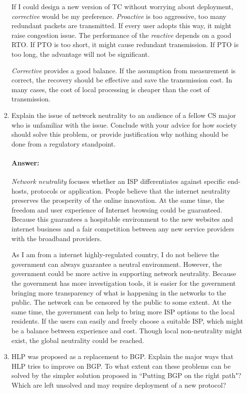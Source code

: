 \documentclass[a4paper,11pt]{article}
\theoremstyle{mytheor}
\begin{document}
\begin{enumerate}
If I could design a new version of TC without worrying about deployment, 
\emph{corrective} would be my preference.
\emph{Proactive} is too aggressive, too many redundant packets are transmitted.
If every user adopts this way, it might raise congestion issue.
The performance of the \emph{reactive} depends on a good RTO.
If PTO is too short, it might cause redundant transmission.
If PTO is too long, the advantage will not be significant.

\emph{Corrective} provides a good balance.
If the assumption from measurement is correct, the recovery should be effective and save the transmission cost.
In many cases, the cost of local processing is cheaper than the cost of transmission.


\item
Explain the issue of network neutrality to an audience of a fellow CS major who is unfamiliar with the issue.
Conclude with your advice for how society should solve this problem, or provide justification why nothing should be done from a regulatory standpoint.
\paragraph{Answer:}
\emph{Network neutrality} focuses whether an ISP differentiates against specific end-hosts, protocols or application.
People believe that the internet neutrality preserves the prosperity of the online innovation.
At the same time, the freedom and user experience of Internet browsing could be guaranteed. 
Because this guarantees a hospitable environment to the new websites and internet business and a fair competition between any new service providers with the broadband providers.

As I am from a internet highly-regulated country, I do not believe the government can always guarantee a neutral environment.
However, the government could be more active in supporting network neutrality.
Because the government has more investigation tools, it is easier for the government bringing more transparency of what is happening in the networks to the public.
The network can be censored by the public to some extent.
At the same time, the government can help to bring more ISP options to the local residents.
If the users can easily and freely choose a suitable ISP, which might be a balance between experience and cost.
Though local non-neutrality might exist, the global neutrality could be reached.

\item
HLP was proposed as a replacement to BGP. 
Explain the major ways that HLP tries to improve on BGP. 
To what extent can these problems can be solved by the simpler solution proposed in ``Putting BGP on the
right path"? 
Which are left unsolved and may require deployment of a new protocol?

\end{enumerate}
\end{document}
